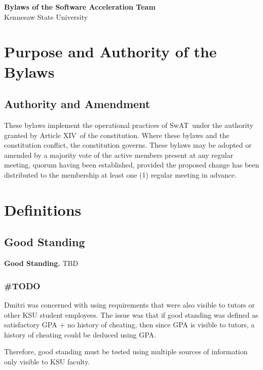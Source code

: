 \documentclass[12pt,letterpaper]{article} %
\newcommand{\org}{Software Acceleration Team}
\newcommand{\orgshort}{SwAT}
\newcommand{\constBylaws}{Article XIV}          %
\begin{document}
\begin{center}
  {\LARGE\bfseries Bylaws of the \org}\\[0.5em]
  {\large Kennesaw State University}
\end{center}

\vspace{1em}

\tableofcontents
\vspace{1em}

\section{Purpose and Authority of the Bylaws}\label{art:bylaws-purpose}
\subsection{Authority and Amendment}\label{sec:bylaws-authority}
These bylaws implement the operational practices of \orgshort\ under the authority granted by
\constBylaws\ of the constitution. Where these bylaws and the constitution conflict, the
constitution governs. These bylaws may be adopted or amended by a majority vote of the active
members present at any regular meeting, quorum having been established, provided the proposed
change has been distributed to the membership at least one (1) regular meeting in advance.

\section{Definitions}\label{art:definitions}
\subsection{Good Standing}\label{sec:good-standing}
\textbf{Good Standing.} TBD
\subsubsection{\#TODO}
Dmitri was concerned with using requirements that were also visible to tutors or other
KSU student employees. The issue was that if good standing was defined as satisfactory GPA +
no history of cheating, then since GPA is visible to tutors, a history of cheating could be
deduced using GPA.

Therefore, good standing must be tested using multiple sources of information only visible to
KSU faculty.
\end{document}
